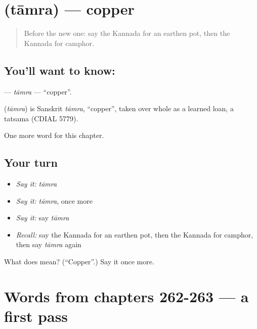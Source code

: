 \section[\texorpdfstring{\kn{ತಾಮ್ರ} (tāmra)}{ತಾಮ್ರ (tāmra)}]{ (tāmra) — copper}

\label{lesson:KA-C266-tamra}



\begin{quote}
Before the new one: say the Kannada for an earthen pot, then the Kannada for camphor.
\end{quote}

\subsection*{You'll want to know: }
\textbf{} — \emph{tāmra} — \textquotedblleft{}copper\textquotedblright{}.

\begin{cousinweb}
\textbf{} (\emph{tāmra}) is Sanskrit \emph{tāmra}, \textquotedblleft{}copper\textquotedblright{}, taken over whole as a learned loan, a tatsama (CDIAL 5779).
\end{cousinweb}

\begin{grammarlens}[title={What you've built}]
One more word for this chapter.
\end{grammarlens}

\subsection*{Your turn}
\begin{itemize}
\raggedright
  \item \emph{Say it:} \emph{tāmra}
  \item \emph{Say it:} \emph{tāmra}, once more
  \item \emph{Say it:} say \emph{tāmra}
  \item \emph{Recall:} say the Kannada for an earthen pot, then the Kannada for camphor, then say \emph{tāmra} again
\end{itemize}

\begin{tcolorbox}[breakable,colback=teal!4,colframe=teal!35!black,title={Before you move on}]
What does  mean? (\textquotedblleft{}Copper\textquotedblright{}.) Say it once more.
\end{tcolorbox}
\section[(dialogue)]{Words from chapters 262-263 — a first pass}

